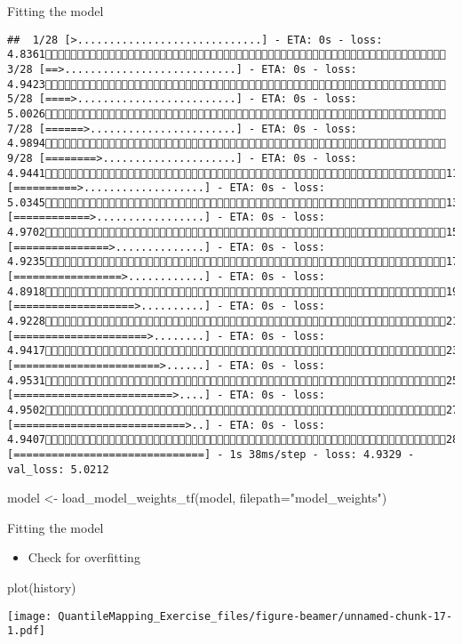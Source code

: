 \documentclass[
  ignorenonframetext,
]{beamer}
\newenvironment{Shaded}{\begin{snugshade}}{\end{snugshade}}
\newcommand{\AttributeTok}[1]{\textcolor[rgb]{0.77,0.63,0.00}{#1}}
\newcommand{\FunctionTok}[1]{\textcolor[rgb]{0.00,0.00,0.00}{#1}}
\newcommand{\NormalTok}[1]{#1}
\newcommand{\OtherTok}[1]{\textcolor[rgb]{0.56,0.35,0.01}{#1}}
\newcommand{\StringTok}[1]{\textcolor[rgb]{0.31,0.60,0.02}{#1}}
\providecommand{\tightlist}{%
  \setlength{\itemsep}{0pt}\setlength{\parskip}{0pt}}
\begin{document}
\begin{frame}[fragile]{Fitting the model}
\begin{verbatim}
##  1/28 [>.............................] - ETA: 0s - loss: 4.8361 3/28 [==>...........................] - ETA: 0s - loss: 4.9423 5/28 [====>.........................] - ETA: 0s - loss: 5.0026 7/28 [======>.......................] - ETA: 0s - loss: 4.9894 9/28 [========>.....................] - ETA: 0s - loss: 4.944111/28 [==========>...................] - ETA: 0s - loss: 5.034513/28 [============>.................] - ETA: 0s - loss: 4.970215/28 [===============>..............] - ETA: 0s - loss: 4.923517/28 [=================>............] - ETA: 0s - loss: 4.891819/28 [===================>..........] - ETA: 0s - loss: 4.922821/28 [=====================>........] - ETA: 0s - loss: 4.941723/28 [=======================>......] - ETA: 0s - loss: 4.953125/28 [=========================>....] - ETA: 0s - loss: 4.950227/28 [===========================>..] - ETA: 0s - loss: 4.940728/28 [==============================] - 1s 38ms/step - loss: 4.9329 - val_loss: 5.0212
\end{verbatim}

\begin{Shaded}
\begin{Highlighting}[]
\NormalTok{model }\OtherTok{\textless{}{-}} \FunctionTok{load\_model\_weights\_tf}\NormalTok{(model,}
                               \AttributeTok{filepath=}\StringTok{"model\_weights"}\NormalTok{)}
\end{Highlighting}
\end{Shaded}
\end{frame}

\begin{frame}[fragile]{Fitting the model}
\protect\hypertarget{fitting-the-model-1}{}
\begin{itemize}
\tightlist
\item
  Check for overfitting
\end{itemize}

\begin{Shaded}
\begin{Highlighting}[]
\FunctionTok{plot}\NormalTok{(history)}
\end{Highlighting}
\end{Shaded}

\texttt{[image: QuantileMapping\_Exercise\_files/figure-beamer/unnamed-chunk-17-1.pdf]}
\end{frame}
\end{document}
